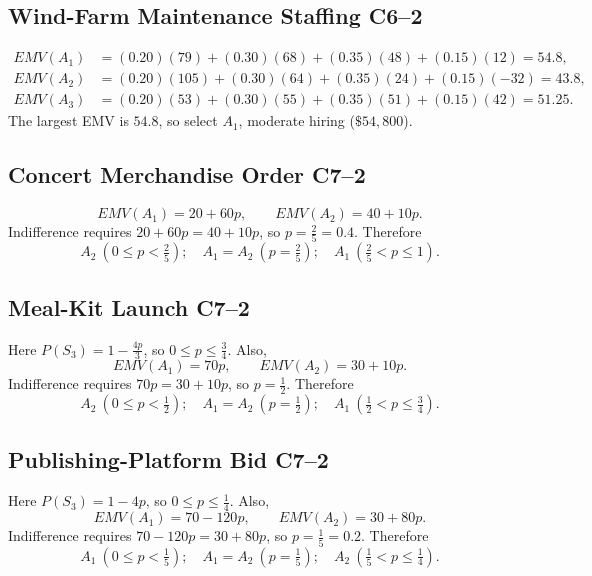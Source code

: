 \subsection{Wind-Farm Maintenance Staffing \hfill C6--2}
\begin{align*}EMV(A_1)&=(0.20)(79)+(0.30)(68)+(0.35)(48)+(0.15)(12)=54.8,\\ EMV(A_2)&=(0.20)(105)+(0.30)(64)+(0.35)(24)+(0.15)(-32)=43.8,\\ EMV(A_3)&=(0.20)(53)+(0.30)(55)+(0.35)(51)+(0.15)(42)=51.25.\end{align*}
The largest EMV is $54.8$, so select $\boxed{A_1}$, moderate hiring ($\$54{,}800$).

\subsection{Concert Merchandise Order \hfill C7--2}
\[
EMV(A_1)=20+60p,\qquad EMV(A_2)=40+10p.
\]
Indifference requires $20+60p=40+10p$, so $p=\frac25=0.4$. Therefore
\[
\boxed{A_2\ (0\le p<\tfrac25);\quad A_1=A_2\ (p=\tfrac25);\quad A_1\ (\tfrac25<p\le1).}
\]

\subsection{Meal-Kit Launch \hfill C7--2}
Here $P(S_3)=1-\frac{4p}{3}$, so $0\le p\le\frac34$. Also,
\[
EMV(A_1)=70p,\qquad EMV(A_2)=30+10p.
\]
Indifference requires $70p=30+10p$, so $p=\frac12$. Therefore
\[
\boxed{A_2\ (0\le p<\tfrac12);\quad A_1=A_2\ (p=\tfrac12);\quad A_1\ (\tfrac12<p\le\tfrac34).}
\]

\subsection{Publishing-Platform Bid \hfill C7--2}
Here $P(S_3)=1-4p$, so $0\le p\le\frac14$. Also,
\[
EMV(A_1)=70-120p,\qquad EMV(A_2)=30+80p.
\]
Indifference requires $70-120p=30+80p$, so $p=\frac15=0.2$. Therefore
\[
\boxed{A_1\ (0\le p<\tfrac15);\quad A_1=A_2\ (p=\tfrac15);\quad A_2\ (\tfrac15<p\le\tfrac14).}
\]


